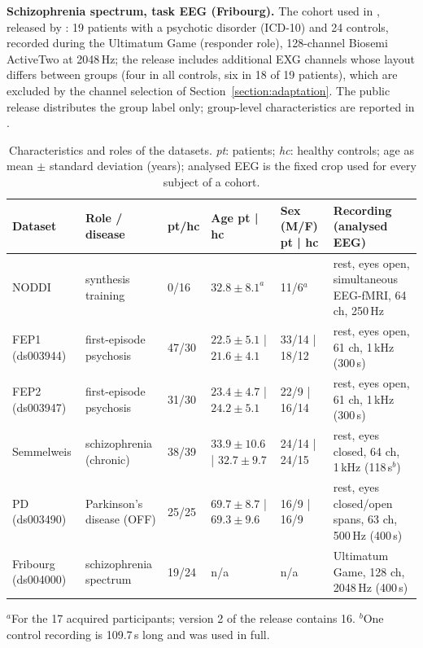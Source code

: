 \documentclass[pdflatex,referee,sn-basic]{sn-jnl}%
\begin{document}
\noindent\textbf{Schizophrenia spectrum, task EEG (Fribourg).} The cohort used in \cite{calhas2023medrxiv}, released by \cite{dataset2022fribourg}: 19 patients with a psychotic disorder (ICD-10) and 24 controls, recorded during the Ultimatum Game (responder role), 128-channel Biosemi ActiveTwo at 2048\,Hz; the release includes additional EXG channels whose layout differs between groups (four in all controls, six in 18 of 19 patients), which are excluded by the channel selection of Section~\ref{section:adaptation}. The public release distributes the group label only; group-level characteristics are reported in \cite{horat2018impaired}.

\begin{table}[!htbp]
    \centering
    \caption{Characteristics and roles of the datasets. \textit{pt}: patients; \textit{hc}: healthy controls; age as mean $\pm$ standard deviation (years); analysed EEG is the fixed crop used for every subject of a cohort.}
    \label{tab:data_description}
    \small
    \begin{tabular}{p{1.75cm} | p{1.95cm} | p{0.85cm} | p{2.0cm} | p{1.3cm} | p{2.65cm}}
        \hline
        \hline
         \hfil Dataset & \hfil Role / disease & \hfil pt/hc & \hfil Age pt | hc & \hfil Sex (M/F) pt | hc & \hfil Recording (analysed EEG) \\
         \hline
         NODDI & synthesis training & 0/16 & \hfil $32.8\pm8.1^{a}$ & \hfil 11/6$^{a}$ & rest, eyes open, simultaneous EEG-fMRI, 64 ch, 250\,Hz \\
         FEP1 (ds003944) & first-episode psychosis & 47/30 & $22.5\pm5.1$ | $21.6\pm4.1$ & 33/14 | 18/12 & rest, eyes open, 61 ch, 1\,kHz (300\,s) \\
         FEP2 (ds003947) & first-episode psychosis & 31/30 & $23.4\pm4.7$ | $24.2\pm5.1$ & 22/9 | 16/14 & rest, eyes open, 61 ch, 1\,kHz (300\,s) \\
         Semmelweis & schizophrenia (chronic) & 38/39 & $33.9\pm10.6$ | $32.7\pm9.7$ & 24/14 | 24/15 & rest, eyes closed, 64 ch, 1\,kHz (118\,s$^{b}$) \\
         PD (ds003490) & Parkinson's disease (OFF) & 25/25 & $69.7\pm8.7$ | $69.3\pm9.6$ & 16/9 | 16/9 & rest, eyes closed/open spans, 63 ch, 500\,Hz (400\,s) \\
         Fribourg (ds004000) & schizophrenia spectrum & 19/24 & n/a & n/a & Ultimatum Game, 128 ch, 2048\,Hz (400\,s) \\
         \hline
         \hline
    \end{tabular}

    \raggedright\footnotesize $^{a}$For the 17 acquired participants; version 2 of the release contains 16. $^{b}$One control recording is 109.7\,s long and was used in full.
\end{table}
\end{document}
